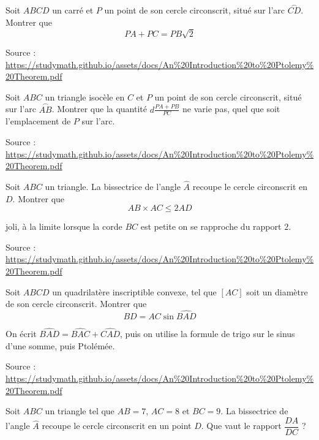 \begin{exo}
Soit $ABCD$ un carré et $P$ un point de son cercle circonscrit, situé sur l'arc $\overset{\frown}{CD}$. Montrer que
\[ PA+PC = PB\sqrt 2 \]
\begin{sol}
Source : \url{https://studymath.github.io/assets/docs/An%20Introduction%20to%20Ptolemy%20Theorem.pdf}
\end{sol}
\end{exo}

\begin{exo}
Soit $ABC$ un triangle isocèle en $C$ et $P$ un point de son cercle circonscrit, situé sur l'arc $\overset{\frown}{AB}$.
Montrer que la quantité $d\frac{PA+PB}{PC}$ ne varie pas, quel que soit l'emplacement de $P$ sur l'arc.
\begin{sol}
Source : \url{https://studymath.github.io/assets/docs/An%20Introduction%20to%20Ptolemy%20Theorem.pdf}
\end{sol}
\end{exo}


\begin{exo}
Soit $ABC$ un triangle.
La bissectrice de l'angle $\widehat A$ recoupe le cercle circonscrit en $D$.
Montrer que 
\[ AB\times AC \leq 2AD\]
\begin{sol}
joli, à la limite lorsque la corde $BC$ est petite on se rapproche du rapport $2$.

Source : \url{https://studymath.github.io/assets/docs/An%20Introduction%20to%20Ptolemy%20Theorem.pdf}
\end{sol}
\end{exo}

\begin{exo}
Soit $ABCD$ un quadrilatère inscriptible convexe, tel que $[AC]$ soit un diamètre de son cercle circonscrit.
Montrer que 
\[ BD = AC \sin \widehat{BAD}\]
\begin{sol}
On écrit $\widehat{BAD} = \widehat{BAC}+\widehat{CAD}$, puis on utilise la formule de trigo sur le sinus d'une somme, puis Ptolémée.

Source : \url{https://studymath.github.io/assets/docs/An%20Introduction%20to%20Ptolemy%20Theorem.pdf}
\end{sol}
\end{exo}

\begin{exo}
Soit $ABC$ un triangle tel que $AB=7$, $AC=8$ et $BC=9$.
La bissectrice de l'angle $\widehat A$ recoupe le cercle circonscrit en un point $D$.
Que vaut le rapport $\dfrac{DA}{DC}$ ? %
\end{exo}


